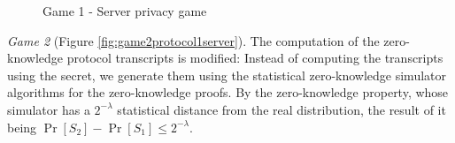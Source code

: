 \begin{figure}[htbp!] 
  \centering
  \caption{Game 1 - Server privacy game}
  \label{fig:game1protocol1server}
\end{figure}

\textit{Game 2} (Figure \ref{fig:game2protocol1server}). The computation of the
zero-knowledge protocol transcripts is modified: Instead of computing the
transcripts using the secret, we generate them using the statistical
zero-knowledge simulator algorithms for the zero-knowledge proofs. By the
zero-knowledge property, whose simulator has a $2^{-\lambda}$ statistical distance from the real distribution, the result of it being
$\Pr[S_2] - \Pr[S_1] \leq 2^{-\lambda}$.

